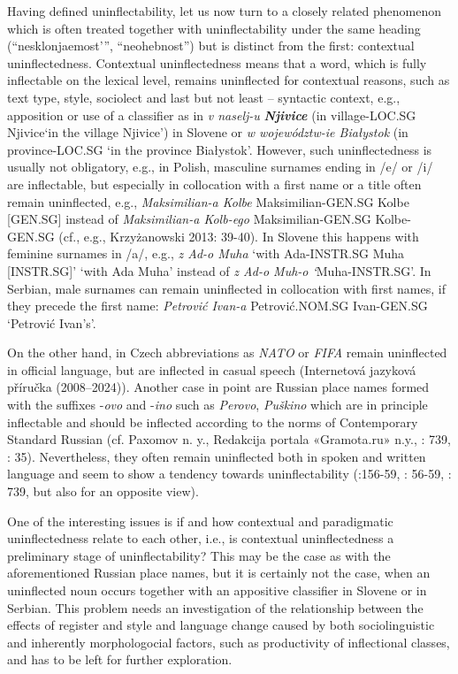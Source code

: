 \documentclass[output=paper]{langscibook}
\begin{document}
Having defined uninflectability, let us now turn to a closely related phenomenon which is often treated together with uninflectability under the same heading (“nesklonjaemost'”, “neohebnost”) but is distinct from the first: contextual uninflectedness. Contextual uninflectedness means that a word, which is fully inflectable on the lexical level, remains uninflected for contextual reasons, such as text type, style, sociolect and last but not least – syntactic context, e.g., apposition or use of a classifier as in \textit{v naselj-u} \textbf{\textit{Njivice}} (in village-LOC.SG Njivice‘in the village Njivice’) in Slovene or \textit{w województw-ie Białystok} (in province-LOC.SG ‘in the province Białystok’. However, such uninflectedness is usually not obligatory, e.g., in Polish, masculine surnames ending in /e/ or /i/ are inflectable, but especially in collocation with a first name or a title often remain uninflected, e.g., \textit{Maksimilian-a Kolbe} Maksimilian-GEN.SG Kolbe [GEN.SG] instead of \textit{Maksimilian-a Kolb-ego} Maksimilian-GEN.SG Kolbe-GEN.SG (cf., e.g., Krzyżanowski 2013: 39-40). In Slovene this happens with feminine surnames in /a/, e.g., \textit{z Ad-o Muha} ‘with Ada-INSTR.SG Muha [INSTR.SG]’ ‘with Ada Muha’ instead of \textit{z Ad-o Muh-o ‘}Muha{}-INSTR.SG’. In Serbian, male surnames can remain uninflected in collocation with first names, if they precede the first name: \textit{Petrović Ivan-a} Petrović.NOM.SG Ivan-GEN.SG ‘Petrović Ivan’s’.

On the other hand, in Czech abbreviations as \textit{NATO} or \textit{FIFA} remain uninflected in official language, but are inflected in casual speech (Internetová jazyková příručka (2008–2024)). Another case in point are Russian place names formed with the suffixes -\textit{ovo} and -\textit{ino} such as \textit{Perovo}, \textit{Puškino} which are in principle inflectable and should be inflected according to the norms of Contemporary Standard Russian (cf. Paxomov n. y., Redakcija portala «Gramota.ru» n.y., \citealt{Zaliznjak2008}: 739, \citealt{Ageenko2010}: 35). Nevertheless, they often remain uninflected both in spoken and written language and seem to show a tendency towards uninflectability (\citealt{Graudina1980}:156-59, \citealt{Panov1968}: 56-59, \citealt{Zaliznjak2008}: 739, but also \citealt{Tejkin2021} for an opposite view). 

One of the interesting issues is if and how contextual and paradigmatic uninflectedness relate to each other, i.e., is contextual uninflectedness a preliminary stage of uninflectability? This may be the case as with the aforementioned Russian place names, but it is certainly not the case, when an uninflected noun occurs together with an appositive classifier in Slovene or in Serbian. This problem needs an investigation of the relationship between the effects of register and style and language change caused by both sociolinguistic and inherently morphologocial factors, such as productivity of inflectional classes, and has to be left for further exploration.
\end{document}
